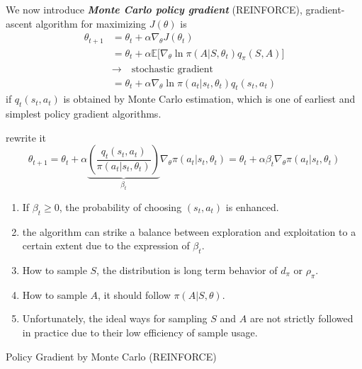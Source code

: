 \documentclass[10pt]{elegantbook}
\newcommand{\mydefination}[1]{\textbf{\textit{\textcolor{structurecolor}{#1}}}}
\begin{document}
We now introduce \mydefination{Monte Carlo policy gradient} (REINFORCE), gradient-ascent algorithm for maximizing $J(\theta)$ is
\begin{equation} \label{eq:policy_gradient}
    \begin{aligned}
        \theta_{t+1} &=\theta_{t}+\alpha\nabla_{\theta}J(\theta_{t}) \\
        &=\theta_{t}+\alpha\mathbb{E}\biggl[\nabla_{\theta}\ln\pi(A|S,\theta_{t})q_{\pi}(S,A)\biggr] \\
        &\rightarrow \quad \text{stochastic gradient} \\
        &= \theta_{t}+\alpha\nabla_{\theta}\ln\pi(a_{t}|s_{t},\theta_{t})q_{t}(s_{t},a_{t})
    \end{aligned}
\end{equation}
if $q_{t}(s_{t},a_{t})$ is obtained by Monte Carlo estimation, which is one of earliest and simplest policy gradient algorithms.

rewrite it 
\begin{equation}
    \theta_{t+1}=\theta_{t} +\alpha
    \underbrace{\left(\frac{q_{t}(s_{t},a_{t})}{\pi(a_{t}|s_{t},\theta_{t})}\right)}_{\beta_t}
    \nabla_{\theta}\pi(a_{t}|s_{t},\theta_{t})
    =\theta_{t} +\alpha \beta_t \nabla_{\theta}\pi(a_{t}|s_{t},\theta_{t})
\end{equation}

\begin{enumerate}
    \item If $\beta_t \geq 0$, the probability of choosing $(s_t, a_t)$ is enhanced.
    \item the algorithm can strike a balance between exploration and exploitation to a certain extent due to the expression of $\beta_t$.
    \item How to sample $S$, the distribution is long term behavior of $d_{\pi}$ or $\rho_{\pi}$.
    \item How to sample $A$, it should follow $\pi(A | S, \theta)$.
    \item Unfortunately, the ideal ways for sampling $S$ and $A$ are not strictly followed in practice
due to their low efficiency of sample usage.
\end{enumerate}

\vspace{\baselineskip}

\begin{algorithm}[H]
\caption{Policy Gradient by Monte Carlo (REINFORCE)}

\end{algorithm}
\end{document}
